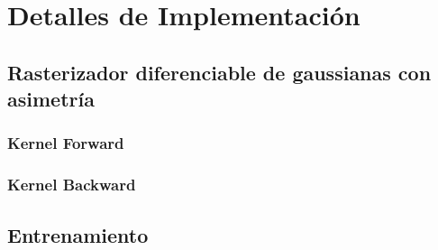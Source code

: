 \chapter{Detalles de Implementación}\label{chapter:implementation}
\section{Rasterizador diferenciable de gaussianas con asimetría}

\subsection{Kernel Forward}
\subsection{Kernel Backward}

\section{Entrenamiento}